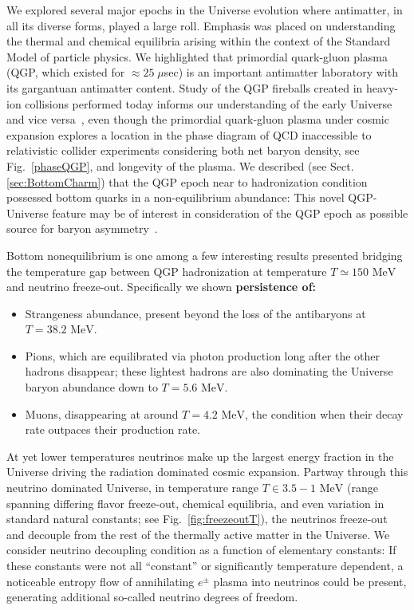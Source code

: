 \documentclass[universe,article,submit,moreauthors,pdftex,a4paper]{Definitions/mdpi}
\newcommand{\MeV}{\text{ MeV}}
\newcommand*{\rf}[1]{Fig.~{\ref{#1}}}
\newcommand*{\rsec}[1]{Sect.\,{\ref{#1}}}
\begin{document}
We explored several major epochs in the Universe evolution where antimatter, in all its diverse forms, played a large roll. Emphasis was placed on understanding the thermal and chemical equilibria arising within the context of the Standard Model of particle physics. We highlighted that primordial quark-gluon plasma (QGP, which existed for $\approx 25\;\mu$sec) is an important antimatter laboratory with its gargantuan antimatter content. Study of the QGP fireballs created in heavy-ion collisions performed today informs our understanding of the early Universe and vice versa~\cite{Borsanyi:2016ksw,Rafelski:2013qeu,Petran:2013lja,Philipsen:2012nu}, even though the primordial quark-gluon plasma under cosmic expansion explores a location in the phase diagram of QCD inaccessible to relativistic collider experiments considering both net baryon density, see \rf{phaseQGP}, and longevity of the plasma. We described (see \rsec{sec:BottomCharm}) that the QGP epoch near to hadronization condition possessed bottom quarks in a non-equilibrium abundance: This novel QGP-Universe feature may be of interest in consideration of the QGP epoch as possible source for baryon asymmetry~\cite{Yang:2020nne}. 

Bottom nonequilibrium is one among a few interesting results presented bridging the temperature gap between QGP hadronization at temperature $T\simeq150\MeV$ and neutrino freeze-out. Specifically we shown {\bf persistence of:}
 \begin{itemize}
 \item Strangeness abundance, present beyond the loss of the antibaryons at $T=38.2\MeV$.
 \item Pions, which are equilibrated via photon production long after the other hadrons disappear; these lightest hadrons are also dominating the Universe baryon abundance down to $T=5.6\MeV$.
 \item Muons, disappearing at around $T=4.2\MeV$, the condition when their decay rate outpaces their production rate.
 \end{itemize}

At yet lower temperatures neutrinos make up the largest energy fraction in the Universe driving the radiation dominated cosmic expansion. Partway through this neutrino dominated Universe, in temperature  range $T\in 3.5-1\MeV$ (range spanning differing flavor freeze-out, chemical equilibria, and even variation in  standard natural constants; see \rf{fig:freezeoutT}), the neutrinos freeze-out and decouple from the rest of the thermally active matter in the Universe. We consider neutrino decoupling condition as a function of elementary constants: If these constants were not all ``constant'' or significantly temperature dependent, a noticeable entropy flow of annihilating $e^{\pm}$ plasma into neutrinos could be present, generating additional so-called neutrino degrees of freedom.
\end{document}
